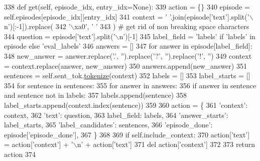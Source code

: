 \begin{DoxyCode}
338     \textcolor{keyword}{def }get(self, episode\_idx, entry\_idx=None):
339         action = \{\}
340         episode = self.episodes[episode\_idx][entry\_idx]
341         context = \textcolor{stringliteral}{' '}.join(episode[\textcolor{stringliteral}{'text'}].split(\textcolor{stringliteral}{'\(\backslash\)n'})[:-1]).replace(
342             \textcolor{stringliteral}{'\(\backslash\)xa0'}, \textcolor{stringliteral}{' '}
343         )  \textcolor{comment}{# get rid of non breaking space characters}
344         question = episode[\textcolor{stringliteral}{'text'}].split(\textcolor{stringliteral}{'\(\backslash\)n'})[-1]
345         label\_field = \textcolor{stringliteral}{'labels'} \textcolor{keywordflow}{if} \textcolor{stringliteral}{'labels'} \textcolor{keywordflow}{in} episode \textcolor{keywordflow}{else} \textcolor{stringliteral}{'eval\_labels'}
346         answers = []
347         \textcolor{keywordflow}{for} answer \textcolor{keywordflow}{in} episode[label\_field]:
348             new\_answer = answer.replace(\textcolor{stringliteral}{'.'}, \textcolor{stringliteral}{''}).replace(\textcolor{stringliteral}{'?'}, \textcolor{stringliteral}{''}).replace(\textcolor{stringliteral}{'!'}, \textcolor{stringliteral}{''})
349             context = context.replace(answer, new\_answer)
350             answers.append(new\_answer)
351         sentences = self.sent\_tok.\hyperlink{namespaceparlai_1_1agents_1_1tfidf__retriever_1_1build__tfidf_a1fdb457e98eb4e4c26047e229686a616}{tokenize}(context)
352         labels = []
353         label\_starts = []
354         \textcolor{keywordflow}{for} sentence \textcolor{keywordflow}{in} sentences:
355             \textcolor{keywordflow}{for} answer \textcolor{keywordflow}{in} answers:
356                 \textcolor{keywordflow}{if} answer \textcolor{keywordflow}{in} sentence \textcolor{keywordflow}{and} sentence \textcolor{keywordflow}{not} \textcolor{keywordflow}{in} labels:
357                     labels.append(sentence)
358                     label\_starts.append(context.index(sentence))
359 
360         action = \{
361             \textcolor{stringliteral}{'context'}: context,
362             \textcolor{stringliteral}{'text'}: question,
363             label\_field: labels,
364             \textcolor{stringliteral}{'answer\_starts'}: label\_starts,
365             \textcolor{stringliteral}{'label\_candidates'}: sentences,
366             \textcolor{stringliteral}{'episode\_done'}: episode[\textcolor{stringliteral}{'episode\_done'}],
367         \}
368 
369         \textcolor{keywordflow}{if} self.include\_context:
370             action[\textcolor{stringliteral}{'text'}] = action[\textcolor{stringliteral}{'context'}] + \textcolor{stringliteral}{'\(\backslash\)n'} + action[\textcolor{stringliteral}{'text'}]
371             del action[\textcolor{stringliteral}{'context'}]
372 
373         \textcolor{keywordflow}{return} action
374 \end{DoxyCode}


